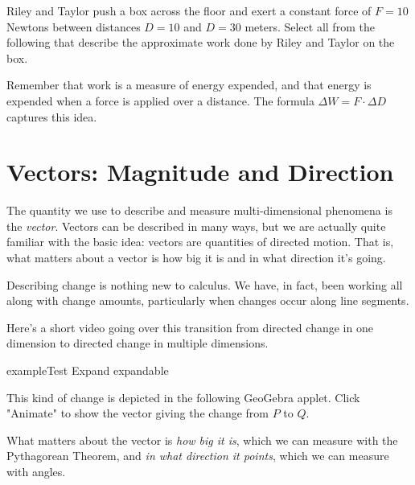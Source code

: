 \documentclass{ximera}
\begin{document}
\begin{problem}
Riley and Taylor push a box across the floor and exert a constant force of $F=10$ Newtons between distances $D=10$ and $D=30$ meters. Select all from the following that describe the approximate work done by Riley and Taylor on the box.

\begin{selectAll}
\end{selectAll}
\begin{feedback}
Remember that work is a measure of energy expended, and that energy is expended when a force is applied over a distance. The formula $\Delta W=F\cdot \Delta D$ captures this idea.
\end{feedback}
\end{problem}


\section{Vectors: Magnitude and Direction}

The quantity we use to describe and measure multi-dimensional phenomena is the \emph{vector}. Vectors can be described in many ways, but we are actually quite familiar with the basic idea: vectors are quantities of directed motion. That is, what matters about a vector is how big it is and in what direction it's going.

Describing change is nothing new to calculus. We have, in fact, been working all along with change amounts, particularly when changes occur along line segments. 

Here's a short video going over this transition from directed change in one dimension to directed change in multiple dimensions.

\begin{expandable}{example}{Test Expand}
    expandable
\end{expandable}

This kind of change is depicted in the following GeoGebra applet. Click "Animate" to show the vector giving the change from $P$ to $Q$.

\begin{center}
\end{center}

What matters about the vector is \emph{how big it is}, which we can measure with the Pythagorean Theorem, and \emph{in what direction it points}, which we can measure with angles.
\end{document}

